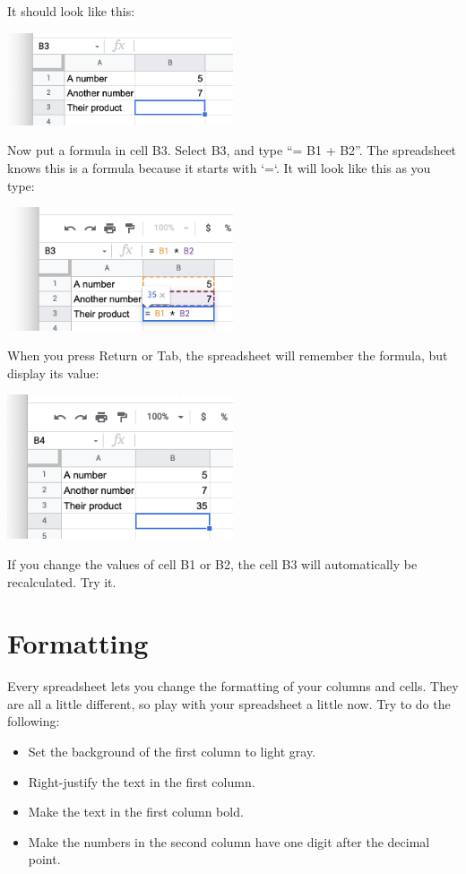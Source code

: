 It should look like this:

\includegraphics[width=0.5\textwidth]{NoFormulas.png}

Now put a formula in cell B3. Select B3, and type ``= B1 + B2''. The spreadsheet knows this is a formula because it starts with `=`. It will look like this as you type:

\includegraphics[width=0.5\textwidth]{TypingFirstFormula.png}

When you press Return or Tab, the spreadsheet will remember the formula, but display its value:

\includegraphics[width=0.5\textwidth]{FirstCalc.png}

If you change the values of cell B1 or B2, the cell B3 will automatically be recalculated. Try it.

\section{Formatting}

Every spreadsheet lets you change the formatting of your columns and cells. They are all a little different, so play with your spreadsheet a little now. Try to do the following:
\begin{itemize}
\item Set the background of the first column to light gray.
\item Right-justify the text in the first column.
\item Make the text in the first column bold.
\item Make the numbers in the second column have one digit after the decimal point.
\end{itemize}

